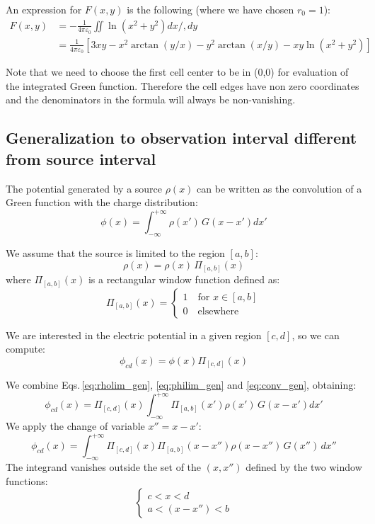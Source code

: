 An expression for $F(x,y)$ is the following (where we have chosen $r_0=1$):
\begin{align}
F(x,y) &=-\frac{1}{4\pi\varepsilon_0}\iint \ln \left(x^{2}+y^{2}\right) dx/,dy\\
&=\frac{1}{4\pi\varepsilon_0}\left[3 x y-x^{2} \arctan (y / x)-y^{2} \arctan (x / y)-x y \ln \left(x^{2}+y^{2}\right)\right]
\end{align}

Note that we need to choose the first cell center to be in (0,0) for evaluation of the integrated Green function. Therefore the cell edges have non zero coordinates and the denominators in the formula will always be non-vanishing.


\subsection{Generalization to observation interval different from source interval}
The potential generated by a source $\rho(x)$ can be written as the convolution of a Green function with the charge distribution:
\begin{equation}
\phi(x) = \int_{-\infty}^{+\infty} \rho(x')\,G(x-x') dx'
\label{eq:conv_gen}
\end{equation}

We assume that the source is limited to the region  $[a, b]$:
\begin{equation}
\rho(x) = \rho(x)\,\Pi_{[a,b]}\left(x\right)
\label{eq:rholim_gen}
\end{equation}
where $\Pi_{[a,b]}(x)$ is a rectangular window function defined as:
\begin{equation}
\Pi_{[a,b]}(x) = 
\begin{cases}
1\quad\text{for } x \in [a, b]\\
0\quad\text{elsewhere}
\end{cases}
\end{equation}

We are interested in the electric potential in a given region $[c, d]$, so we can compute:
\begin{equation}
\phi_{cd}(x) = \phi(x) \Pi_{[c, d]}\left(x\right)
\label{eq:philim_gen}
\end{equation}

We combine Eqs.\,\eqref{eq:rholim_gen}, \eqref{eq:philim_gen} and \eqref{eq:conv_gen}, obtaining:
\begin{equation}
\phi_{cd}(x) = \Pi_{[c,d]}\left( x\right)
\int_{-\infty}^{+\infty} 
\Pi_{[a,b]}\left(x'\right)
\rho(x')\,G(x-x') dx'
\end{equation}
We apply the change of variable $x'' = x - x'$:
\begin{equation}
\phi_{cd}(x) = 
\int_{-\infty}^{+\infty} 
\Pi_{[c,d]}\left({x}\right)
\Pi_{[a,b]}\left({x-x''}\right)
\rho(x-x'')\,G(x'') \,dx''
\label{eq:conv1_gen}
\end{equation}
The integrand vanishes outside the set of the $(x, x'')$ defined by the two window functions:
\begin{equation}
\begin{cases}
c < x <d\\
a < (x-x'') <b
\end{cases}
\end{equation}


